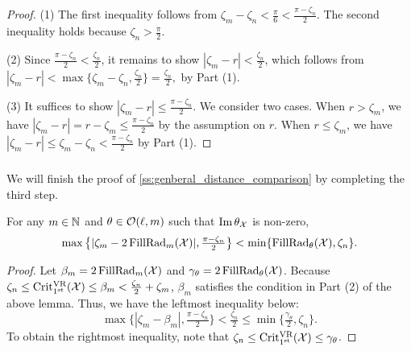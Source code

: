 \begin{proof}
    	(1) The first inequality follows from $\zeta_m - \zeta_n < \tfrac{\pi}{6} < \tfrac{\pi - \zeta_n}{2}$.
        The second inequality holds because $\zeta_n > \tfrac{\pi}{2}$.
     
        (2) Since $\tfrac{\pi - \zeta_n}{2} < \tfrac{\zeta_n}{2}$, it remains to show $|\zeta_m  - r | < \tfrac{\zeta_n}{2}$, which follows from
    	\(
    	|\zeta_m  - r | < \max\big\{\zeta_m - \zeta_n, \tfrac{\zeta_n}{2}\big\} = \tfrac{\zeta_n}{2},
    	\) by Part (1).

    	(3) %
        It suffices to show $|\zeta_m  - r | \leq \tfrac{\pi - \zeta_n}{2}$.
        We consider two cases.
        When $r > \zeta_m$, we have
    	$|\zeta_m  - r | = r - \zeta_m \leq
        \tfrac{\pi - \zeta_n}{2}
    	$ by the assumption on $r$.
    	When $r \leq \zeta_m$, we have
    	\(
    	|\zeta_m  - r | \leq \zeta_m - \zeta_n
    	< \tfrac{\pi - \zeta_n}{2}
    	\) by Part (1).
\end{proof}

\subsubsection{}
\label{sss:comparison_lemma_zeta_n}

We will finish the proof of \cref{ss:genberal_distance_comparison} by completing the third step.

\medskip \lemma
For any $m \in \mathbb{N}$ and $\theta \in \mathcal{O}(\ell, m)$ such that $\operatorname{Im} \theta_{\mathcal{X}}$ is non-zero,
\[\max\big\{|\zeta_m  - 2\operatorname{FillRad}_{m}(\mathcal{X}) |, \tfrac{\pi - \zeta_n}{2}\big\} < \min\{\operatorname{FillRad}_{\theta}(\mathcal{X}), \zeta_n\}.\]
\begin{proof}
    Let $\beta_m = 2\operatorname{FillRad}_{m}(\mathcal{X})$ and $\gamma_\theta = 2\operatorname{FillRad}_{\theta}(\mathcal{X})$.
    Because \(\zeta_n \leq \operatorname{Crit^{\mathrm{VR}}_{1^{\mathrm{st}}}}(\mathcal{X}) \leq \beta_m < \tfrac{\zeta_n}{2} + \zeta_m\), $\beta_m$ satisfies the condition in Part (2) of the above lemma. 
    Thus, we have the leftmost inequality below:
    \[
    \max\big\{|\zeta_m - \beta_m|, \tfrac{\pi - \zeta_n}{2}\big\} < \tfrac{\zeta_n}{2}
    \leq
    \min\big\{\tfrac{\gamma_\theta}{2}, \zeta_n\big\}.
    \]
    To obtain the rightmost inequality, note that \(\zeta_n \leq \operatorname{Crit^{\mathrm{VR}}_{1^{\mathrm{st}}}}(\mathcal{X}) \leq \gamma_\theta\).
\end{proof}


